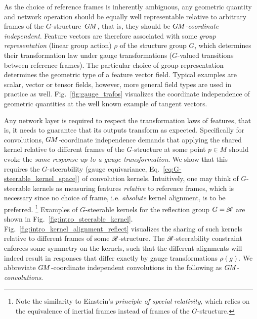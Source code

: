 As the choice of reference frames is inherently ambiguous, any geometric quantity and network operation should be equally well representable relative to arbitrary frames of the $G$-structure~$G\mkern-1.4muM$, that is, they should be $G\mkern-1.4muM$-\emph{coordinate independent}.
Feature vectors are therefore associated with some \emph{group representation} (linear group action) $\rho$ of the structure group $G$, which determines their transformation law under gauge transformations ($G$-valued transitions between reference frames).
The particular choice of group representation determines the geometric type of a feature vector field.
Typical examples are scalar, vector or tensor fields, however, more general field types are used in practice as well.
Fig.~\ref{fig:gauge_trafos} visualizes the coordinate independence of geometric quantities at the well known example of tangent vectors.


Any network layer is required to respect the transformation laws of features, that is, it needs to guarantee that its outputs transform as expected.
Specifically for convolutions, $G\mkern-1.4muM$-coordinate independence demands that applying the shared kernel relative to different frames of the $G$-structure at some point $p\in M$ should evoke the \emph{same response up to a gauge transformation}.
We show that this requires the $G$-steerability (gauge equivariance, Eq.~\eqref{eq:G-steerable_kernel_space}) of convolution kernels.
Intuitively, one may think of $G$-steerable kernels as measuring features \emph{relative} to reference frames, which is necessary since no choice of frame, i.e. \emph{absolute} kernel alignment, is to be preferred.%
\footnote{
    Note the similarity to Einstein's \emph{principle of special relativity}, which relies on the equivalence of inertial frames instead of frames of the $G$-structure.
}
Examples of $G$-steerable kernels for the reflection group $G=\mathscr{R}$ are shown in Fig.~\ref{fig:intro_steerable_kernel}.
Fig.~\ref{fig:intro_kernel_alignment_reflect} visualizes the sharing of such kernels relative to different frames of some $\mathscr{R}$-structure.
The $\mathscr{R}$-steerability constraint enforces some symmetry on the kernels, such that the different alignments will indeed result in responses that differ exactly by gauge transformations $\rho(g)$.
We abbreviate $G\mkern-1.4muM$-coordinate independent convolutions in the following as $G\mkern-1.4muM$-\emph{convolutions}.


